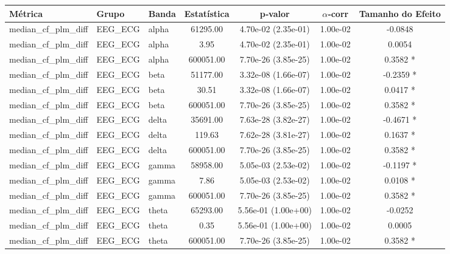 \begin{tabular}{l l l c c c c}
    \toprule
    Métrica & Grupo & Banda & Estatística & p‑valor & $\alpha$‑corr & Tamanho do Efeito \\
    \midrule
    median\_cf\_plm\_diff & EEG\_ECG & alpha & 61295.00 & 4.70e-02 (2.35e-01) & 1.00e-02 & -0.0848  \\
    median\_cf\_plm\_diff & EEG\_ECG & alpha & 3.95 & 4.70e-02 (2.35e-01) & 1.00e-02 & 0.0054  \\
    median\_cf\_plm\_diff & EEG\_ECG & alpha & 600051.00 & 7.70e-26 (3.85e-25) & 1.00e-02 & 0.3582 * \\
    median\_cf\_plm\_diff & EEG\_ECG & beta & 51177.00 & 3.32e-08 (1.66e-07) & 1.00e-02 & -0.2359 * \\
    median\_cf\_plm\_diff & EEG\_ECG & beta & 30.51 & 3.32e-08 (1.66e-07) & 1.00e-02 & 0.0417 * \\
    median\_cf\_plm\_diff & EEG\_ECG & beta & 600051.00 & 7.70e-26 (3.85e-25) & 1.00e-02 & 0.3582 * \\
    median\_cf\_plm\_diff & EEG\_ECG & delta & 35691.00 & 7.63e-28 (3.82e-27) & 1.00e-02 & -0.4671 * \\
    median\_cf\_plm\_diff & EEG\_ECG & delta & 119.63 & 7.62e-28 (3.81e-27) & 1.00e-02 & 0.1637 * \\
    median\_cf\_plm\_diff & EEG\_ECG & delta & 600051.00 & 7.70e-26 (3.85e-25) & 1.00e-02 & 0.3582 * \\
    median\_cf\_plm\_diff & EEG\_ECG & gamma & 58958.00 & 5.05e-03 (2.53e-02) & 1.00e-02 & -0.1197 * \\
    median\_cf\_plm\_diff & EEG\_ECG & gamma & 7.86 & 5.05e-03 (2.53e-02) & 1.00e-02 & 0.0108 * \\
    median\_cf\_plm\_diff & EEG\_ECG & gamma & 600051.00 & 7.70e-26 (3.85e-25) & 1.00e-02 & 0.3582 * \\
    median\_cf\_plm\_diff & EEG\_ECG & theta & 65293.00 & 5.56e-01 (1.00e+00) & 1.00e-02 & -0.0252  \\
    median\_cf\_plm\_diff & EEG\_ECG & theta & 0.35 & 5.56e-01 (1.00e+00) & 1.00e-02 & 0.0005  \\
    median\_cf\_plm\_diff & EEG\_ECG & theta & 600051.00 & 7.70e-26 (3.85e-25) & 1.00e-02 & 0.3582 * \\
    \bottomrule
\end{tabular}
